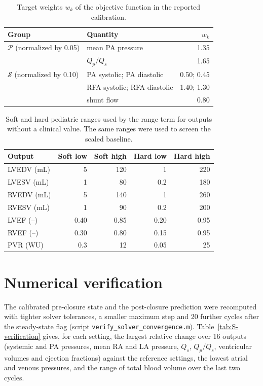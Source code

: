 \documentclass{article}
\begin{document}
\begin{table}[H]
\centering\small
\caption{Target weights $w_k$ of the objective function in the reported calibration.}
\label{tab:S-weights}
\begin{tabular}{llr}
\toprule
\textbf{Group} & \textbf{Quantity} & $w_k$ \\
\midrule
$\mathcal{P}$ (normalized by 0.05) & mean PA pressure & 1.35 \\
 & $Q_p/Q_s$ & 1.65 \\
$\mathcal{S}$ (normalized by 0.10) & PA systolic; PA diastolic & 0.50; 0.45 \\
 & RFA systolic; RFA diastolic & 1.40; 1.30 \\
 & shunt flow & 0.80 \\
\bottomrule
\end{tabular}
\end{table}

\begin{table}[H]
\centering\small
\caption{Soft and hard pediatric ranges used by the range term for outputs without a clinical value. The same ranges were used to screen the scaled baseline.}
\label{tab:S-ranges}
\begin{tabular}{lrrrr}
\toprule
\textbf{Output} & \textbf{Soft low} & \textbf{Soft high} & \textbf{Hard low} & \textbf{Hard high} \\
\midrule
LVEDV (mL) & 5 & 120 & 1 & 220 \\
LVESV (mL) & 1 & 80 & 0.2 & 180 \\
RVEDV (mL) & 5 & 140 & 1 & 260 \\
RVESV (mL) & 1 & 90 & 0.2 & 200 \\
LVEF (--) & 0.40 & 0.85 & 0.20 & 0.95 \\
RVEF (--) & 0.30 & 0.80 & 0.15 & 0.95 \\
PVR (WU) & 0.3 & 12 & 0.05 & 25 \\
\bottomrule
\end{tabular}
\end{table}

\section{Numerical verification}
\label{sec:S-verification}
The calibrated pre-closure state and the post-closure prediction were recomputed with tighter solver tolerances, a smaller maximum step and 20 further cycles after the steady-state flag (script \texttt{verify\_solver\_convergence.m}). Table~\ref{tab:S-verification} gives, for each setting, the largest relative change over 16 outputs (systemic and PA pressures, mean RA and LA pressure, $Q_s$, $Q_p/Q_s$, ventricular volumes and ejection fractions) against the reference settings, the lowest atrial and venous pressures, and the range of total blood volume over the last two cycles.
\end{document}
